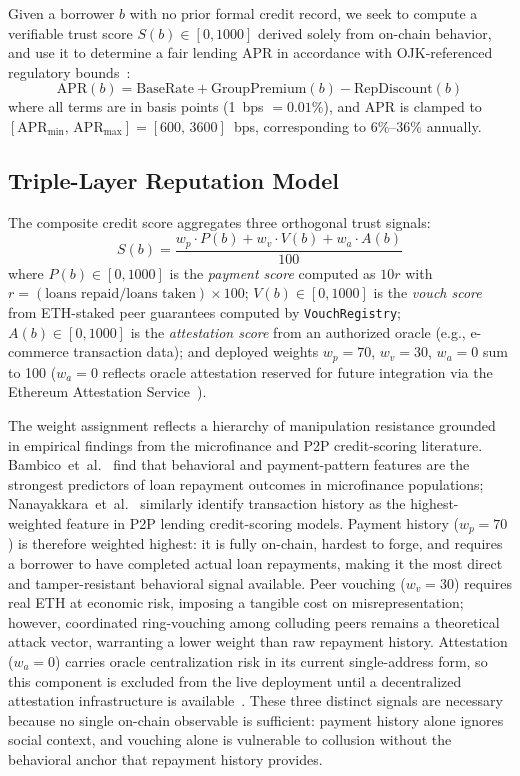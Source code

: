 \documentclass[conference]{IEEEtran}
\begin{document}
Given a borrower $b$ with no prior formal credit record, we seek to compute a
verifiable trust score $S(b) \in [0, 1000]$ derived solely from on-chain
behavior, and use it to determine a fair lending APR in accordance with
OJK-referenced regulatory bounds~\cite{b23}:
%
\begin{equation}
\text{APR}(b) = \text{BaseRate} + \text{GroupPremium}(b) - \text{RepDiscount}(b)
\label{eq:apr}
\end{equation}
%
where all terms are in basis points (1~bps $= 0.01\%$), and APR is clamped to
$[\text{APR}_\text{min},\, \text{APR}_\text{max}] = [600,\, 3600]$~bps,
corresponding to 6\%--36\% annually.

\subsection{Triple-Layer Reputation Model}

The composite credit score aggregates three orthogonal trust signals:
%
\begin{equation}
S(b) = \frac{w_p \cdot P(b) + w_v \cdot V(b) + w_a \cdot A(b)}{100}
\label{eq:score}
\end{equation}
%
where $P(b) \in [0, 1000]$ is the \textit{payment score} computed as $10r$
with $r = (\text{loans repaid} / \text{loans taken}) \times 100$; $V(b)
\in [0, 1000]$ is the \textit{vouch score} from ETH-staked peer guarantees
computed by \texttt{VouchRegistry}; $A(b) \in [0, 1000]$ is the
\textit{attestation score} from an authorized oracle (e.g., e-commerce
transaction data); and deployed weights $w_p = 70$, $w_v = 30$, $w_a = 0$
sum to 100 ($w_a = 0$ reflects oracle attestation reserved for future
integration via the Ethereum Attestation Service~\cite{b6}).

The weight assignment reflects a hierarchy of manipulation resistance grounded
in empirical findings from the microfinance and P2P credit-scoring literature.
Bambico~et~al.~\cite{b21} find that behavioral and payment-pattern features
are the strongest predictors of loan repayment outcomes in microfinance
populations; Nanayakkara~et~al.~\cite{b5} similarly identify transaction
history as the highest-weighted feature in P2P lending credit-scoring models.
Payment history ($w_p = 70$) is therefore weighted highest: it is fully
on-chain, hardest to forge, and requires a borrower to have completed actual
loan repayments, making it the most direct and tamper-resistant behavioral
signal available. Peer vouching ($w_v = 30$) requires real ETH at economic
risk, imposing a tangible cost on misrepresentation; however, coordinated
ring-vouching among colluding peers remains a theoretical attack vector,
warranting a lower weight than raw repayment history. Attestation ($w_a = 0$)
carries oracle centralization risk in its current single-address form, so
this component is excluded from the live deployment until a decentralized
attestation infrastructure is available~\cite{b6}. These three distinct
signals are necessary because no single on-chain observable is sufficient:
payment history alone ignores social context, and vouching alone is vulnerable
to collusion without the behavioral anchor that repayment history provides.
\end{document}

